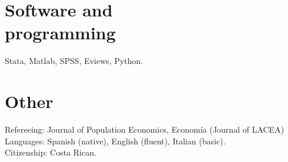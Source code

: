 \documentclass[margin]{res} %
\begin{document}
\begin{resume}
%

\section{Software and \\ programming}
Stata, Matlab, SPSS, Eviews, Python. \\

\section{Other}
Refereeing: Journal of Population Economics, Econom\'ia (Journal of LACEA) \\
Languages: Spanish (native), English (fluent), Italian (basic). \\
Citizenship: Costa Rican.





\end{resume}
\end{document}
